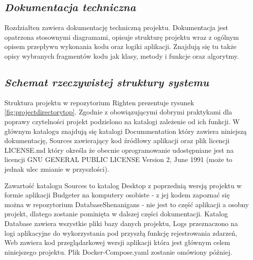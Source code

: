 \documentclass[a4paper,10pt, twoside]{report}
\newcommand{\customstylechapter}[1]{\large{\textit{#1}}}
\newcommand{\customstylesection}[1]{\textbf{\textit{#1}}}
\begin{document}
\begin{large}
\chapter{\customstylechapter{Dokumentacja techniczna}}
{Rozdziałten zawiera dokumentację techniczną projektu. Dokumentacja jest 
opatrzona stosownymi diagramami, opisuje strukturę projektu wraz z ogólnym 
opisem przepływu wykonania kodu oraz logiki aplikacji. Znajdują się tu także 
opisy wybranych fragmentów kodu jak klasy, metody i funkcje oraz algorytmy.}



\section{\customstylesection{Schemat rzeczywistej struktury systemu}}
{Struktura projektu w repozytorium Righten \cite{GITRighten} prezentuje rysunek 
\ref*{fig:projectdirectorytop}. Zgodnie z obowiązującymi dobrymi praktykami dla 
poprawy czytelności projekt podzielono na katalogi zależenie od ich funkcji. W 
głównym katalogu znajdują się katalogi Docummentation który zawiera niniejszą 
dokumentację, Sources zawierający kod źródłowy aplikacji oraz plik licencji 
LICENSE.md który określa że obecnie oprogramowanie udostępniane jest na licencji
 GNU GENERAL PUBLIC LICENSE Version 2, June 1991 (może to jednak ulec zmianie w 
przyszłości).}

{Zawartość katalogu Sources to katalog Desktop z poprzednią wersją projektu w 
formie aplikacji Budgeter na komputery osobiste - z jej kodem zapoznać się można w 
repozytorium DatabaseShenanigans \cite{GITBudgeterApp} - nie jest to część 
aplikacji a osobny projekt, dlatego zostanie pominięta w dalszej części 
dokumentacji. Katalog Database zawiera wszystkie pliki bazy danych projektu, 
Logs przeznaczono na logi aplikacyjne do wykorzystania pod przyszłą funkcję 
rejestrowania zdarzeń, Web zawiera kod przeglądarkowej wersji aplikacji która 
jest głównym celem niniejszego projektu. Plik Docker-Compose.yaml zostanie 
omówiony później.}


\end{large}
\end{document}
